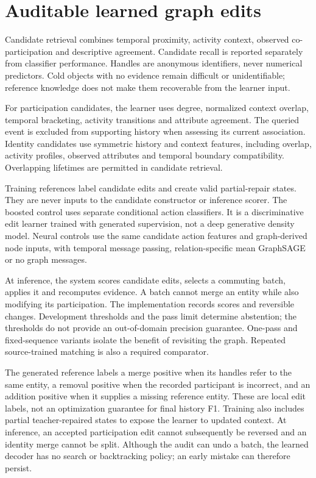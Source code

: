 \documentclass[11pt]{article}
\begin{document}
\section{Auditable learned graph edits}
Candidate retrieval combines temporal proximity, activity context, observed co-participation and descriptive agreement. Candidate recall is reported separately from classifier performance. Handles are anonymous identifiers, never numerical predictors. Cold objects with no evidence remain difficult or unidentifiable; reference knowledge does not make them recoverable from the learner input.

For participation candidates, the learner uses degree, normalized context overlap, temporal bracketing, activity transitions and attribute agreement. The queried event is excluded from supporting history when assessing its current association. Identity candidates use symmetric history and context features, including overlap, activity profiles, observed attributes and temporal boundary compatibility. Overlapping lifetimes are permitted in candidate retrieval.

Training references label candidate edits and create valid partial-repair states. They are never inputs to the candidate constructor or inference scorer. The boosted control uses separate conditional action classifiers. It is a discriminative edit learner trained with generated supervision, not a deep generative density model. Neural controls use the same candidate action features and graph-derived node inputs, with temporal message passing, relation-specific mean GraphSAGE or no graph messages.

At inference, the system scores candidate edits, selects a commuting batch, applies it and recomputes evidence. A batch cannot merge an entity while also modifying its participation. The implementation records scores and reversible changes. Development thresholds and the pass limit determine abstention; the thresholds do not provide an out-of-domain precision guarantee. One-pass and fixed-sequence variants isolate the benefit of revisiting the graph. Repeated source-trained matching is also a required comparator.

The generated reference labels a merge positive when its handles refer to the same entity, a removal positive when the recorded participant is incorrect, and an addition positive when it supplies a missing reference entity. These are local edit labels, not an optimization guarantee for final history F1. Training also includes partial teacher-repaired states to expose the learner to updated context. At inference, an accepted participation edit cannot subsequently be reversed and an identity merge cannot be split. Although the audit can undo a batch, the learned decoder has no search or backtracking policy; an early mistake can therefore persist.
\end{document}
